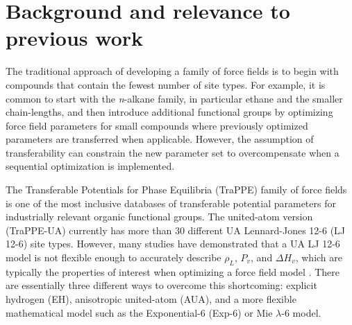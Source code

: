\documentclass[12pt]{article}
\begin{document}

\section{Background and relevance to previous work}

The traditional approach of developing a family of force fields is to begin with compounds that contain the fewest number of site types. For example, it is common to start with the \textit{n}-alkane family, in particular ethane and the smaller chain-lengths, and then introduce additional functional groups by optimizing force field parameters for small compounds where previously optimized parameters are transferred when applicable. However, the assumption of transferability can constrain the new parameter set to overcompensate when a sequential optimization is implemented. 

The Transferable Potentials for Phase Equilibria (TraPPE) family of force fields is one of the most inclusive databases of transferable potential parameters for industrially relevant organic functional groups. The united-atom version (TraPPE-UA) currently has more than 30 different UA Lennard-Jones 12-6 (LJ 12-6) site types. However, many studies have demonstrated that a UA LJ 12-6 model is not flexible enough to accurately describe $\rho_L$, $P_v$, and $\Delta H_v$, which are typically the properties of interest when optimizing a force field model \cite{TraPPE_EH,Mie,Pareto}. There are essentially three different ways to overcome this shortcoming: explicit hydrogen (EH), anisotropic united-atom (AUA), and a more flexible mathematical model such as the Exponential-6 (Exp-6) or Mie $\lambda$-6 model.
\end{document}

